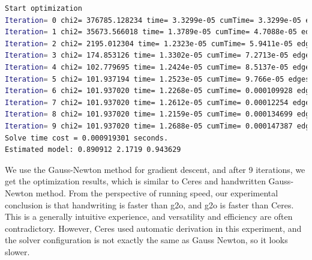 \clearpage

\begin{lstlisting}[language=sh,caption=Terminal output:]
Start optimization
Iteration= 0 chi2= 376785.128234 time= 3.3299e-05 cumTime= 3.3299e-05 edges= 100 schur= 0
Iteration= 1 chi2= 35673.566018 time= 1.3789e-05 cumTime= 4.7088e-05 edges= 100 schur= 0
Iteration= 2 chi2= 2195.012304 time= 1.2323e-05 cumTime= 5.9411e-05 edges= 100 schur= 0
Iteration= 3 chi2= 174.853126 time= 1.3302e-05 cumTime= 7.2713e-05 edges= 100 schur= 0
Iteration= 4 chi2= 102.779695 time= 1.2424e-05 cumTime= 8.5137e-05 edges= 100 schur= 0
Iteration= 5 chi2= 101.937194 time= 1.2523e-05 cumTime= 9.766e-05 edges= 100 schur= 0
Iteration= 6 chi2= 101.937020 time= 1.2268e-05 cumTime= 0.000109928 edges= 100 schur= 0
Iteration= 7 chi2= 101.937020 time= 1.2612e-05 cumTime= 0.00012254 edges= 100 schur= 0
Iteration= 8 chi2= 101.937020 time= 1.2159e-05 cumTime= 0.000134699 edges= 100 schur= 0
Iteration= 9 chi2= 101.937020 time= 1.2688e-05 cumTime= 0.000147387 edges= 100 schur= 0
Solve time cost = 0.000919301 seconds. 
Estimated model: 0.890912 2.1719 0.943629
\end{lstlisting}

We use the Gauss-Newton method for gradient descent, and after 9 iterations, we get the optimization results, which is similar to Ceres and handwritten Gauss-Newton method. From the perspective of running speed, our experimental conclusion is that handwriting is faster than g2o, and g2o is faster than Ceres. This is a generally intuitive experience, and versatility and efficiency are often contradictory. However, Ceres used automatic derivation in this experiment, and the solver configuration is not exactly the same as Gauss Newton, so it looks slower.
